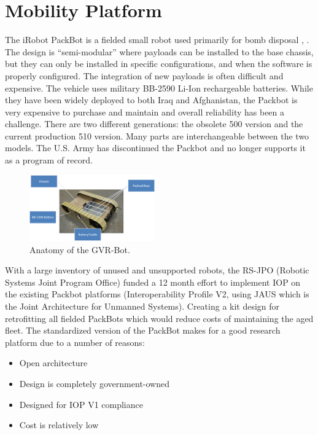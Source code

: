 \section{Mobility Platform}\label{sec:platform}

The iRobot PackBot is a fielded small robot used primarily for bomb disposal \cite{iRobot}, \cite{Hogg2002}. The design is ``semi-modular'' where payloads can be installed to the base chassis, but they can only be installed in specific configurations, and when the software is properly configured. The integration of new payloads is often difficult and expensive. The vehicle uses military BB-2590 Li-Ion rechargeable batteries. While they have been widely deployed to both Iraq and Afghanistan, the Packbot is very expensive to purchase and maintain and overall reliability has been a challenge. There are two different generations: the obsolete 500 version and the current production 510 version. Many parts are interchangeable between the two models. The U.S. Army has discontinued the Packbot and no longer supports it as a program of record.

\begin{figure}
	\centering
	\includegraphics[width=0.48\textwidth]{./pictures/packbot.png}
	\caption{Anatomy of the GVR-Bot.}
	\label{fig:packbot}
\end{figure}

With a large inventory of unused and unsupported robots, the RS-JPO (Robotic Systems Joint Program Office) funded a 12 month effort to implement IOP on the existing Packbot platforms (Interoperability Profile V2, using JAUS which is the Joint Architecture for Unmanned Systems). Creating a kit design for retrofitting all fielded PackBots which would reduce costs of maintaining the aged fleet. The standardized version of the PackBot makes for a good research platform due to a number of reasons:
\begin{itemize}
	\item Open architecture
	\item Design is completely government-owned
	\item Designed for IOP V1 compliance
	\item Cost is relatively low
\end{itemize}

